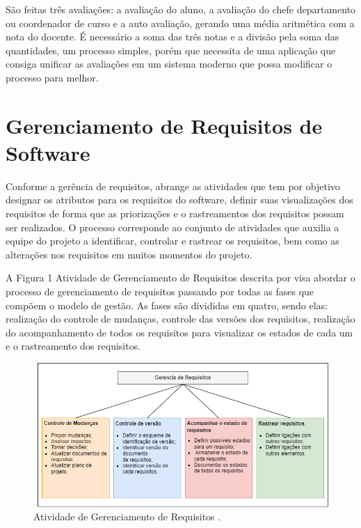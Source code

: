     São feitas três avaliações: a avaliação do aluno, a avaliação do chefe departamento ou coordenador de curso e a auto avaliação, gerando uma média aritmética com a nota do docente. É necessário a soma das três notas e a divisão pela soma das quantidades, um processo simples, porém que necessita de uma aplicação que consiga unificar as avaliações em um sistema moderno que possa modificar o processo para melhor.


    

\section{Gerenciamento de Requisitos de Software}

    Conforme  a gerência de requisitos, abrange as atividades que tem por objetivo designar os atributos para os requisitos do software, definir suas visualizações dos requisitos de forma que as priorizações e o rastreamentos dos requisitos possam ser realizados. O processo corresponde ao conjunto de atividades que auxilia a equipe do projeto a identificar, controlar e rastrear os requisitos, bem como as alterações nos requisitos em muitos momentos do projeto.

    A Figura 1 Atividade de Gerenciamento de Requisitos descrita por  visa abordar o processo de gerenciamento de requisitos passando por todas as fases que compõem o modelo de gestão. As fases são divididas em quatro, sendo elas: realização do controle de mudanças, controle das versões dos requisitos, realização do acompanhamento de todos os requisitos para visualizar os estados de cada um e o rastreamento dos requisitos.
    
    \begin{figure}[h]
    \centering
    \includegraphics[width=1.0
    \textwidth]{./img/GerenciamentoRequisitos.png}
    \caption{Atividade de Gerenciamento de Requisitos .}
    \label{fig:GerenciamentoRequisitos}
    \end{figure}
    
